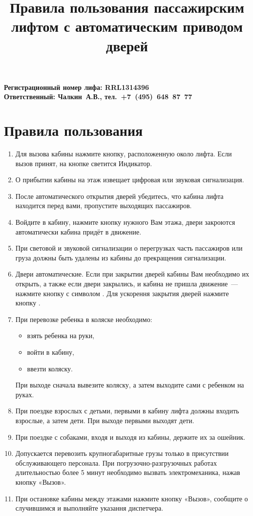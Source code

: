 \documentclass[10pt, a4paper]{article}
\title{Правила пользования пассажирским лифтом с автоматическим приводом дверей}
\newcommand{\ffbox}[1]{%
  {%
   \setlength{\fboxsep}{-1\fboxrule}%
   \fbox{\hspace{2.3pt}\strut#1\hspace{2.3pt}}%
  }%
}
\begin{document}
\textbf{
  \mbox{}\hfill Регистрационный номер лифа: RRL1314396\\
  \mbox{}\hfill Ответственный: Чалкин~А.В., тел.~+7~(495)~648~87~77
}

\section*{Правила пользования}

\begin{enumerate}
  \item Для вызова кабины нажмите кнопку, расположенную около лифта. Если вызов принят, на кнопке светится Индикатор.
  \item О прибытии кабины на этаж извещает цифровая или звуковая сигнализация.
  \item После автоматического открытия дверей убедитесь, что кабина лифта находится перед вами, пропустите выходящих пассажиров.
  \item Войдите в кабину, нажмите кнопку нужного Вам этажа, двери закроются автоматически кабина придёт в движение.
  \item При световой и звуковой сигнализации о перегрузках часть пассажиров или груза должны быть удалены из кабины до прекращения
    сигнализации.
  \item Двери автоматические. Если при закрытии дверей кабины Вам необходимо их открыть, а также если двери закрылись, и кабина не пришла
    движение~--- нажмите кнопку с символом \ffbox{\textlangle~||~\textrangle}. Для ускорення закрытия дверей нажмите кнопку
    \ffbox{\textbf{\textrangle~||~\textlangle}}.
  \item При перевозке ребенка в коляске необходимо:
    \begin{itemize}
      \item взять ребенка на руки,
      \item войти в кабину,
      \item ввезти коляску.
    \end{itemize}
    При выходе сначала вывезите коляску, а затем выходите сами с ребенком на руках.
  \item При поездке взрослых с детьми, первыми в кабину лифта должны входить взрослые, а затем дети. При выходе первыми выходят дети.
  \item При поездке с собаками, входя и выходя из кабины, держите их за ошейник.
  \item Допускается перевозить крупногабаритные грузы только в присутствии обслуживающего персонала. При погрузочно-разгрузочных работах
    длительностью более 5 минут необходимо вызвать электромеханика, нажав кнопку «Вызов».
  \item При остановке кабины между этажами нажмите кнопку «Вызов», сообщите о случившимся и выполняйте указання диспетчера.
\end{enumerate}
\end{document}
